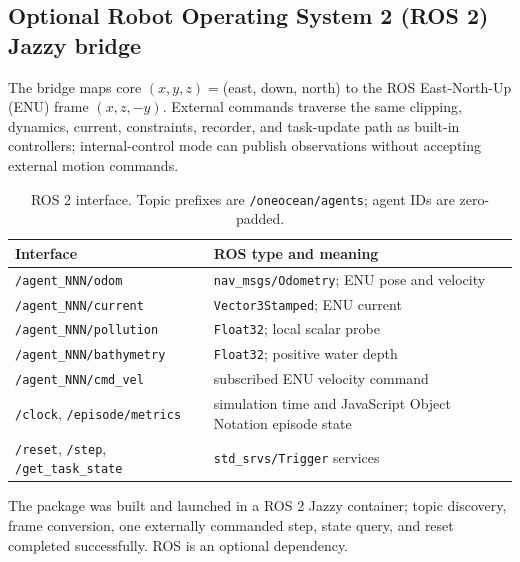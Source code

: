\subsection{Optional Robot Operating System 2 (ROS 2) Jazzy bridge}

The bridge maps core $(x,y,z)=$(east, down, north) to the ROS East-North-Up (ENU) frame $(x,z,-y)$. External commands traverse the same clipping, dynamics, current, constraints, recorder, and task-update path as built-in controllers; internal-control mode can publish observations without accepting external motion commands.

\begin{table}[t]
\centering
\scriptsize
\setlength{\tabcolsep}{3pt}
\renewcommand{\arraystretch}{1.08}
\begin{tabularx}{\columnwidth}{l X}
\toprule
\textbf{Interface} & \textbf{ROS type and meaning} \\
\midrule
\texttt{/agent\_NNN/odom} & \texttt{nav\_msgs/Odometry}; ENU pose and velocity \\
\texttt{/agent\_NNN/current} & \texttt{Vector3Stamped}; ENU current \\
\texttt{/agent\_NNN/pollution} & \texttt{Float32}; local scalar probe \\
\texttt{/agent\_NNN/bathymetry} & \texttt{Float32}; positive water depth \\
\texttt{/agent\_NNN/cmd\_vel} & subscribed ENU velocity command \\
\texttt{/clock}, \texttt{/episode/metrics} & simulation time and JavaScript Object Notation episode state \\
\texttt{/reset}, \texttt{/step}, \texttt{/get\_task\_state} & \texttt{std\_srvs/Trigger} services \\
\bottomrule
\end{tabularx}
\caption{ROS 2 interface. Topic prefixes are \texttt{/oneocean/agents}; agent IDs are zero-padded.}
\label{tab:app_ros_contract}
\end{table}

The package was built and launched in a ROS 2 Jazzy container; topic discovery, frame conversion, one externally commanded step, state query, and reset completed successfully. ROS is an optional dependency.
